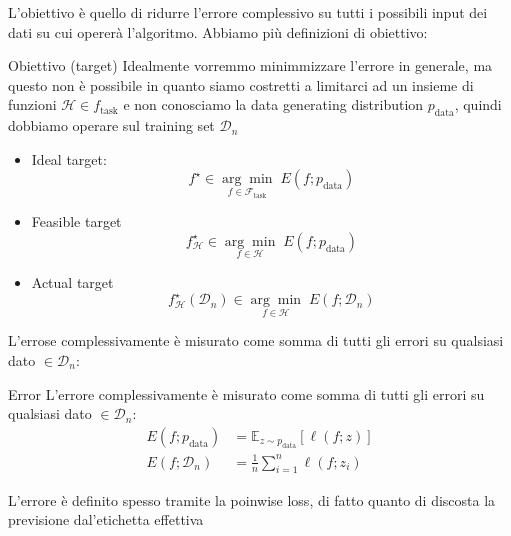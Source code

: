 L'obiettivo  è quello di ridurre l'errore complessivo su tutti i possibili input dei dati su cui opererà l'algoritmo. Abbiamo più definizioni di obiettivo:
\begin{definizione}{Obiettivo (target)}
	Idealmente vorremmo minimmizzare l'errore in generale, ma questo non è possibile in quanto siamo costretti a limitarci ad un insieme di funzioni $ \mathcal{H} \in f_{\text{task}} $ e non conosciamo la data generating distribution $ p_{\text{data}} $, quindi dobbiamo operare sul training set $ \mathcal{D}_n $
	\begin{itemize}
		\item Ideal target:
		      \[
			      f^{\star} \in \underset{f \in \mathcal{F}_{\mathrm{task}}}{\arg\min} \; E(f; p_{\mathrm{data}})
		      \]
		\item Feasible target
		      \[
			      f^{\star}_{\mathcal{H}} \in \underset{f \in \mathcal{H}}{\arg\min} \; E(f; p_{\mathrm{data}})
		      \]
		\item Actual target
		      \[
			      f^{\star}_{\mathcal{H}}(\mathcal{D}_n) \in \underset{f \in \mathcal{H}}{\arg\min} \; E(f; \mathcal{D}_n)
		      \]
	\end{itemize}
\end{definizione}
L'errose complessivamente è misurato come somma di tutti gli errori su qualsiasi dato $ \in \mathcal{D}_n $:
\begin{definizione}{Error}
	L'errore complessivamente è misurato come somma di tutti gli errori su qualsiasi dato $ \in \mathcal{D}_n $:
	\begin{align*}
		E(f; p_{\mathrm{data}}) & = \mathbb{E}_{z \sim p_{\mathrm{data}}} \left[ \ell(f; z) \right] \\
		E(f; \mathcal{D}_n)     & = \frac{1}{n} \sum_{i=1}^{n} \ell(f; z_i)
	\end{align*}
\end{definizione}
L'errore è definito spesso tramite la poinwise loss, di fatto quanto di discosta la previsione dal'etichetta effettiva
